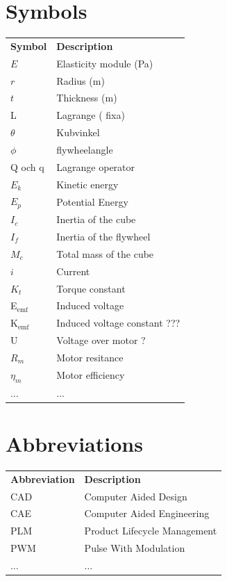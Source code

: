 \documentclass[a4paper,11pt]{kth-mag}
\newcommand{\textunderscript}[1]{$_{\text{#1}}$}
\begin{document}
\section*{Symbols}
\noindent{}\begin{tabular}{@{}p{2.5cm}l}
\textbf{Symbol} 	& \textbf{Description} \vspace{.5em} \\
$E$ 		& Elasticity module (Pa) \\
$r$		& Radius (m) \\
$t$		& Thickness (m) \\
L			& Lagrange ( fixa) \\
$\theta$		& Kubvinkel \\
$\phi$		& flywheelangle \\
Q och q		& Lagrange operator \\
$E_k	$		& Kinetic energy \\
$E_p$		& Potential Energy \\
$I_c$		& Inertia of the cube\\
$I_f$		& Inertia of the flywheel\\
$M_c$		& Total mass of the cube \\
$i$			& Current\\
$K_t$		& Torque constant\\

E\textunderscript{emf} 	& Induced voltage \\
K\textunderscript{emf} 	& Induced voltage constant ??? \\

U			& Voltage over motor ?\\
$R_m	$		& Motor resitance \\
$\eta_m$		& Motor efficiency\\	
$\ldots$	& $\ldots$ 
\end{tabular}

\section*{Abbreviations}
\noindent{}\begin{tabular}{@{}p{2.5cm}l}
\textbf{Abbreviation} 	& \textbf{Description} \vspace{.5em} \\
CAD			& Computer Aided Design \\
CAE			& Computer Aided Engineering\\
PLM			& Product Lifecycle Management\\
PWM			& Pulse With Modulation\\
	
$\ldots$		& $\ldots$ 
\end{tabular}
\cleardoublepage
\end{document}
